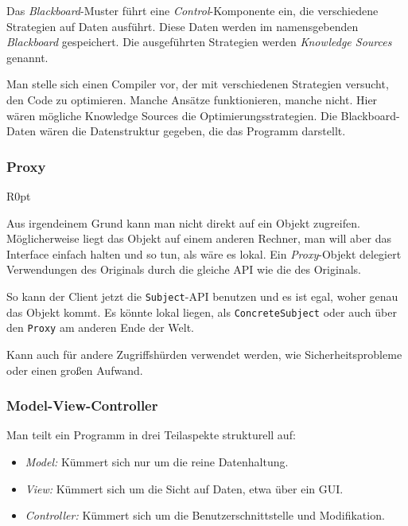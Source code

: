 \documentclass{panikzettel}
\begin{document}
Das \emph{Blackboard}-Muster führt eine \emph{Control}-Komponente ein, die verschiedene Strategien auf Daten ausführt. Diese Daten werden im namensgebenden \emph{Blackboard} gespeichert. Die ausgeführten Strategien werden \emph{Knowledge Sources} genannt.

Man stelle sich einen Compiler vor, der mit verschiedenen Strategien versucht, den Code zu optimieren. Manche Ansätze funktionieren, manche nicht. Hier wären mögliche Knowledge Sources die Optimierungsstrategien. Die Blackboard-Daten wären die Datenstruktur gegeben, die das Programm darstellt.


\subsubsection{Proxy}

\begin{wrapfigure}[12]{R}{0pt}
\end{wrapfigure}

Aus irgendeinem Grund kann man nicht direkt auf ein Objekt zugreifen. Möglicherweise liegt das Objekt auf einem anderen Rechner, man will aber das Interface einfach halten und so tun, als wäre es lokal. Ein \emph{Proxy}-Objekt delegiert Verwendungen des Originals durch die gleiche API wie die des Originals.

So kann der Client jetzt die \lstinline{Subject}-API benutzen und es ist egal, woher genau das Objekt kommt. Es könnte lokal liegen, als \lstinline{ConcreteSubject} oder auch über den \lstinline{Proxy} am anderen Ende der Welt.

Kann auch für andere Zugriffshürden verwendet werden, wie Sicherheitsprobleme oder einen großen Aufwand.

\subsubsection{Model-View-Controller}

Man teilt ein Programm in drei Teilaspekte strukturell auf: \begin{itemize}
\item \emph{Model:} Kümmert sich nur um die reine Datenhaltung.
\item \emph{View:} Kümmert sich um die Sicht auf Daten, etwa über ein GUI.
\item \emph{Controller:} Kümmert sich um die Benutzerschnittstelle und Modifikation. %
\end{itemize}
\end{document}
